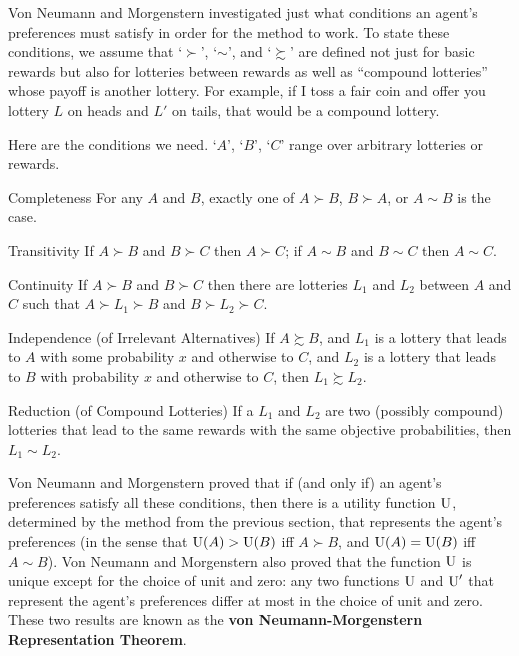 Von Neumann and Morgenstern investigated just what conditions an agent's
preferences must satisfy in order for the method to work. To state these
conditions, we assume that `$\succ$', `$\sim$', and `$\succsim$' are defined not
just for basic rewards but also for lotteries between rewards as well as
``compound lotteries'' whose payoff is another lottery. For example, if I toss a
fair coin and offer you lottery $L$ on heads and $L'$ on tails, that would be a
compound lottery.

Here are the conditions we need. `$A$', `$B$', `$C$' range over arbitrary
lotteries or rewards.

\begin{genericthm}{Completeness}
  For any $A$ and $B$, exactly one of $A \succ B$, $B\succ A$, or $A
  \sim B$ is the case.
\end{genericthm}
\vspace{-5mm}
\begin{genericthm}{Transitivity}
  If $A \succ B$ and $B \succ C$ then $A \succ C$; if $A \sim B$ and $B \sim C$
  then $A \sim C$.
\end{genericthm}
\vspace{-5mm}
\begin{genericthm}{Continuity}
  If $A \succ B$ and $B \succ C$ then there are lotteries $L_1$ and $L_2$
  between $A$ and $C$ such that $A \succ L_1 \succ B$ and $B \succ L_2 \succ C$.
\end{genericthm}
\vspace{-5mm}
\begin{genericthm}{Independence (of Irrelevant Alternatives)}
  If $A \succsim B$, and $L_1$ is a lottery that leads to $A$ with some probability
  $x$ and otherwise to $C$, and $L_2$ is a lottery that leads to $B$ with
  probability $x$ and otherwise to $C$, then $L_1 \succsim L_2$.
\end{genericthm}
\vspace{-5mm}
\begin{genericthm}{Reduction (of Compound Lotteries)}
  If a $L_1$ and $L_2$ are two (possibly compound) lotteries that lead
  to the same rewards with the same objective probabilities, then $L_1
  \sim L_2$.
\end{genericthm}

Von Neumann and Morgenstern proved that if (and only if) an agent's preferences
satisfy all these conditions, then there is a utility function $\text{U}$, determined
by the method from the previous section, that represents the agent's preferences
(in the sense that $\text{U}(A) > \text{U}(B)$ iff $A \succ B$, and $\text{U}(A)=\text{U}(B)$ iff
$A \sim B$). Von Neumann and Morgenstern also proved that the function $\text{U}$ is
unique except for the choice of unit and zero: any two functions $\text{U}$ and $\text{U}'$
that represent the agent's preferences differ at most in the choice of unit and
zero. These two results are known as the \textbf{von Neumann-Morgenstern
  Representation Theorem}.

